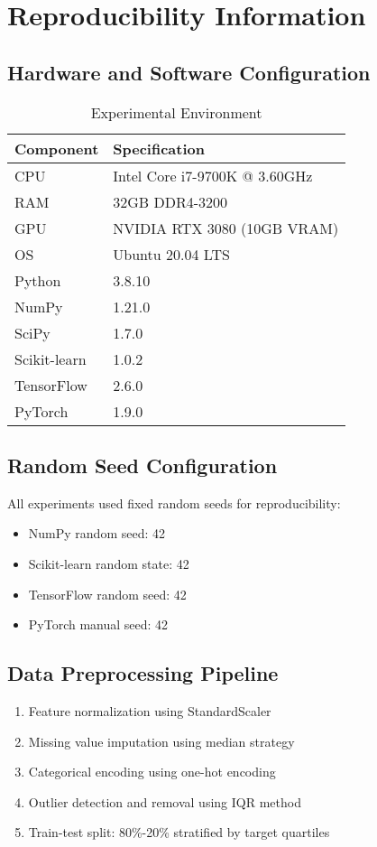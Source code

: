 \documentclass[journal]{IEEEtran}
\begin{document}
\section{Reproducibility Information}

\subsection{Hardware and Software Configuration}

\begin{table}[htbp]
\centering
\caption{Experimental Environment}
\begin{tabular}{ll}
\toprule
\textbf{Component} & \textbf{Specification} \\
\midrule
CPU & Intel Core i7-9700K @ 3.60GHz \\
RAM & 32GB DDR4-3200 \\
GPU & NVIDIA RTX 3080 (10GB VRAM) \\
OS & Ubuntu 20.04 LTS \\
Python & 3.8.10 \\
NumPy & 1.21.0 \\
SciPy & 1.7.0 \\
Scikit-learn & 1.0.2 \\
TensorFlow & 2.6.0 \\
PyTorch & 1.9.0 \\
\bottomrule
\end{tabular}
\end{table}

\subsection{Random Seed Configuration}

All experiments used fixed random seeds for reproducibility:
\begin{itemize}
\item NumPy random seed: 42
\item Scikit-learn random state: 42
\item TensorFlow random seed: 42
\item PyTorch manual seed: 42
\end{itemize}

\subsection{Data Preprocessing Pipeline}

\begin{enumerate}
\item Feature normalization using StandardScaler
\item Missing value imputation using median strategy
\item Categorical encoding using one-hot encoding
\item Outlier detection and removal using IQR method
\item Train-test split: 80\%-20\% stratified by target quartiles
\end{enumerate}



\end{document}
